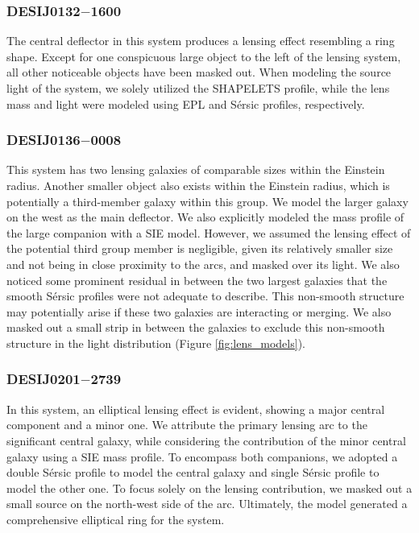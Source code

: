\documentclass{aa}
\begin{document}
\subsubsection{DESIJ0132$-$1600}

The central deflector in this system produces a lensing effect resembling a ring shape. Except for one conspicuous large object to the left of the lensing system, all other noticeable objects have been masked out. When modeling the source light of the system, we solely utilized the SHAPELETS profile, while the lens mass and light were modeled using EPL and S\'ersic profiles, respectively.

\subsubsection{DESIJ0136$-$0008}

This system has two lensing galaxies of comparable sizes within the Einstein radius. Another smaller object also exists within the Einstein radius, which is potentially a third-member galaxy within this group. We model the larger galaxy on the west as the main deflector. We also explicitly modeled the mass profile of the large companion with a SIE model. However, we assumed the lensing effect of the potential third group member is negligible, given its relatively smaller size and not being in close proximity to the arcs, and masked over its light. We also noticed some prominent residual in between the two largest galaxies that the smooth S\'ersic profiles were not adequate to describe. This non-smooth structure may potentially arise if these two galaxies are interacting or merging. We also masked out a small strip in between the galaxies to exclude this non-smooth structure in the light distribution (Figure \ref{fig:lens_models}).


\subsubsection{DESIJ0201$-$2739}

In this system, an elliptical lensing effect is evident, showing a major central component and a minor one. We attribute the primary lensing arc to the significant central galaxy, while considering the contribution of the minor central galaxy using a SIE mass profile. To encompass both companions, we adopted a double S\'ersic  profile to model the central galaxy and single S\'ersic  profile to model the other one. To focus solely on the lensing contribution, we masked out a small source on the north-west side of the arc. Ultimately, the model generated a comprehensive elliptical ring for the system.
\end{document}
